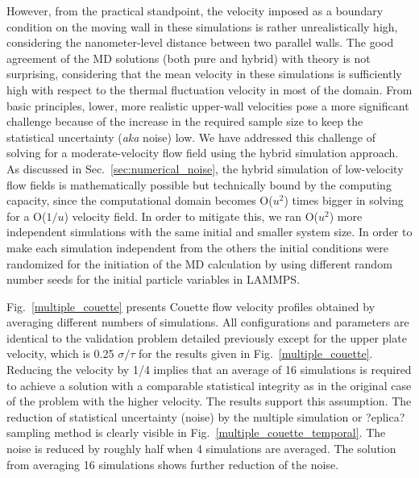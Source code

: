 \documentclass[preprint,12pt]{elsarticle}
\begin{document}
However, from the practical standpoint, the velocity imposed as a boundary condition on the moving wall in these simulations is rather unrealistically high, considering the nanometer-level distance between two parallel walls. The good agreement of the MD solutions (both pure and hybrid) with theory is not surprising, considering that the mean velocity in these simulations is sufficiently high with respect to the thermal fluctuation velocity in most of the domain. From basic principles, lower, more realistic upper-wall velocities pose a more significant challenge because of the increase in the required sample size to keep the statistical uncertainty (\emph{aka} noise) low. We have addressed this challenge of solving for a moderate-velocity flow field using the hybrid simulation approach. As discussed in Sec.~\ref{sec:numerical_noise}, the hybrid simulation of low-velocity flow fields is mathematically possible but technically bound by the computing capacity, since the computational domain becomes O($u^2$) times bigger in solving for a O($1/u$) velocity field. In order to mitigate this, we ran O($u^2$) more independent simulations with the same initial and smaller system size. In order to make each simulation independent from the others the initial conditions were randomized for the initiation of the MD calculation by using different random number seeds for the initial particle variables in LAMMPS. 


Fig.~\ref{multiple_couette} presents Couette flow velocity profiles obtained by averaging different numbers of simulations. All configurations and parameters are identical to the validation problem detailed previously except for the upper plate velocity, which is 0.25 $\sigma/\tau$ for the results given in Fig.~\ref{multiple_couette}. Reducing the velocity by 1/4 implies that an average of 16 simulations is required to achieve a solution with a comparable statistical integrity as in the original case of the problem with the higher velocity. The results support this assumption. The reduction of statistical uncertainty (noise) by the multiple simulation or ?eplica?sampling method is clearly visible in Fig.~\ref{multiple_couette_temporal}. The noise is reduced by roughly half when 4 simulations are averaged. The solution from averaging 16 simulations shows further reduction of the noise. 
\end{document}

